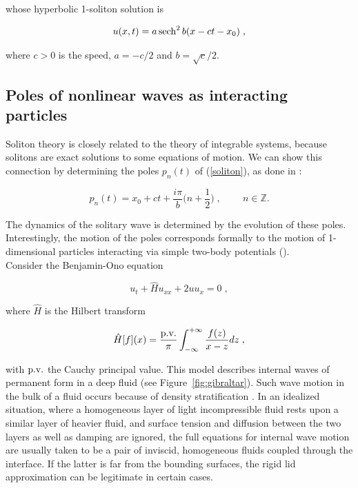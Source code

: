 whose hyperbolic 1-soliton solution is

\begin{equation}\label{soliton}
    u(x,t) = a\operatorname{sech}^2{b (x - ct - x_0)}\;,
\end{equation}

where $c > 0$ is the speed, $a = -c/2$ and $b = \sqrt{c}/2$.

\subsection{Poles of nonlinear waves as interacting particles}
Soliton theory is closely related to the theory of integrable systems, because solitons are exact solutions to some equations of motion. We can show this connection by determining the poles $p_n(t)$ of (\ref{soliton}), as done in \cite{deconinckpole}:

\begin{equation}
p_n(t) = x_0 + ct + \frac{i\pi}{b} \Big (n + \frac{1}{2} \Big )\;,\;\;\;\;\;\;\;\;n \in \mathbb{Z}.
\end{equation}

The dynamics of the solitary wave is determined by the evolution of these poles. Interestingly, the motion of the poles corresponds formally to the motion of 1-dimensional particles interacting via simple two-body potentials (\cite{assis2009}). \\
Consider the Benjamin-Ono equation \cite{benjamin1967, ono1975}

\begin{equation}\label{benjaminono}
    u_t + \hat H u_{xx} + 2uu_x = 0\;,
\end{equation}

where $\hat H$ is the Hilbert transform

\begin{equation}
    \hat H[f](x) = \frac{\textnormal{p.v.}}{\pi}\int_{- \infty}^{+ \infty} \frac{f(z)}{x - z}dz\;,
\end{equation}

with $\textnormal{p.v.}$ the Cauchy principal value.  This model describes internal waves of permanent form in a deep fluid (see Figure~\ref{fig:gibraltar}). Such wave motion in the bulk of a fluid occurs because of density stratification \cite{bona2019}. In an idealized situation, where a homogeneous layer of light incompressible fluid rests upon a similar layer of heavier fluid, and surface tension and diffusion between the two layers as well as damping are ignored, the full equations for internal wave motion are usually taken to be a pair of inviscid, homogeneous fluids coupled through the interface. If the latter is far from the bounding surfaces, the rigid lid approximation can be legitimate in certain cases. 

